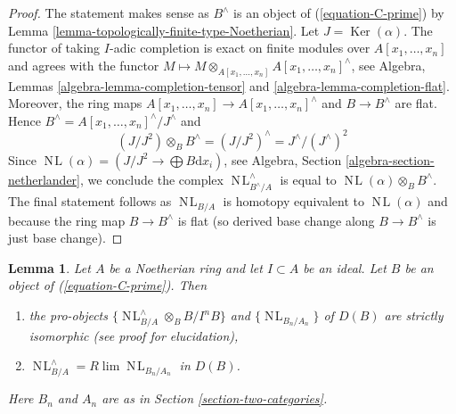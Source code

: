 \documentclass{stacks-project}
\theoremstyle{plain}
\newtheorem{lemma}[subsection]{Lemma}
\theoremstyle{definition}
\theoremstyle{remark}
\numberwithin{equation}{subsection}
\def\lim{\mathop{\mathrm{lim}}\nolimits}
\def\NL{\mathop{N\!L}\nolimits}
\def\Ker{\mathop{\mathrm{Ker}}}
\begin{document}
\begin{proof}
The statement makes sense as $B^\wedge$ is an object of
(\ref{equation-C-prime}) by
Lemma \ref{lemma-topologically-finite-type-Noetherian}.
Let $J = \Ker(\alpha)$. The functor of taking
$I$-adic completion is exact on finite modules over
$A[x_1, \ldots, x_n]$ and agrees with the functor
$M \mapsto M \otimes_{A[x_1, \ldots, x_n]} A[x_1, \ldots, x_n]^\wedge$, see
Algebra, Lemmas \ref{algebra-lemma-completion-tensor} and
\ref{algebra-lemma-completion-flat}. Moreover, the ring maps
$A[x_1, \ldots, x_n] \to A[x_1, \ldots, x_n]^\wedge$
and $B \to B^\wedge$ are flat. Hence
$B^\wedge = A[x_1, \ldots, x_n]^\wedge / J^\wedge$ and
$$
(J/J^2) \otimes_B B^\wedge = (J/J^2)^\wedge = J^\wedge/(J^\wedge)^2
$$
Since $\NL(\alpha) = (J/J^2 \to \bigoplus B\text{d}x_i)$,
see Algebra, Section \ref{algebra-section-netherlander},
we conclude the complex $\NL_{B^\wedge/A}^\wedge$ is equal
to $\NL(\alpha) \otimes_B B^\wedge$. The final statement
follows as $\NL_{B/A}$ is homotopy equivalent to $\NL(\alpha)$
and because the ring map $B \to B^\wedge$ is flat (so derived
base change along $B \to B^\wedge$ is just base change).
\end{proof}

\begin{lemma}
\label{lemma-NL-is-limit}
Let $A$ be a Noetherian ring and let $I \subset A$ be an ideal.
Let $B$ be an object of (\ref{equation-C-prime}). Then
\begin{enumerate}
\item the pro-objects
$\{\NL_{B/A}^\wedge \otimes_B B/I^nB\}$ and $\{\NL_{B_n/A_n}\}$
of $D(B)$ are strictly isomorphic (see proof for elucidation),
\item $\NL_{B/A}^\wedge = R\lim \NL_{B_n/A_n}$ in $D(B)$.
\end{enumerate}
Here $B_n$ and $A_n$ are as in Section \ref{section-two-categories}.
\end{lemma}
\end{document}
